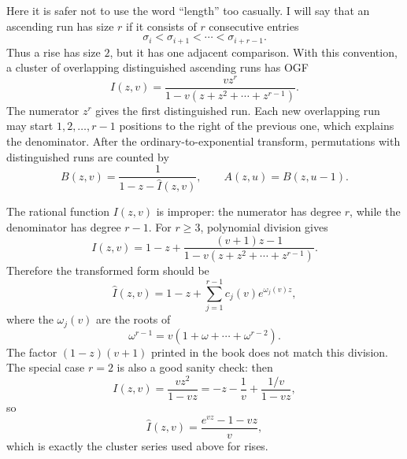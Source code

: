 
Here it is safer not to use the word ``length'' too casually. I will say that an ascending run
has size $r$ if it consists of $r$ consecutive entries
\[
    \sigma_i < \sigma_{i+1} < \cdots < \sigma_{i+r-1}.
\]
Thus a rise has size $2$, but it has one adjacent comparison. With this convention, a cluster
of overlapping distinguished ascending runs has OGF
\begin{equation*}
    I(z,v)=\frac{v z^r}{1-v(z+z^2+\cdots+z^{r-1})}.
\end{equation*}
The numerator $z^r$ gives the first distinguished run. Each new overlapping run may start
$1,2,\ldots,r-1$ positions to the right of the previous one, which explains the denominator.
After the ordinary-to-exponential transform, permutations with distinguished runs are counted by
\begin{equation*}
    B(z,v)=\frac{1}{1-z-\widehat{I}(z,v)},\qquad
    A(z,u)=B(z,u-1).
\end{equation*}

The rational function $I(z,v)$ is improper: the numerator has degree $r$, while the denominator
has degree $r-1$. For $r\geq 3$, polynomial division gives
\begin{equation*}
    I(z,v)
        =1-z+\frac{(v+1)z-1}{1-v(z+z^2+\cdots+z^{r-1})}.
\end{equation*}
Therefore the transformed form should be
\begin{equation*}
    \widehat{I}(z,v)
        =1-z+\sum_{j=1}^{r-1}c_j(v)e^{\omega_j(v)z},
\end{equation*}
where the $\omega_j(v)$ are the roots of
\[
    \omega^{r-1}=v(1+\omega+\cdots+\omega^{r-2}).
\]
The factor $(1-z)(v+1)$ printed in the book does not match this division. The special case
$r=2$ is also a good sanity check: then
\[
    I(z,v)=\frac{v z^2}{1-vz}
        =-z-\frac{1}{v}+\frac{1/v}{1-vz},
\]
so
\[
    \widehat{I}(z,v)=\frac{e^{vz}-1-vz}{v},
\]
which is exactly the cluster series used above for rises.

